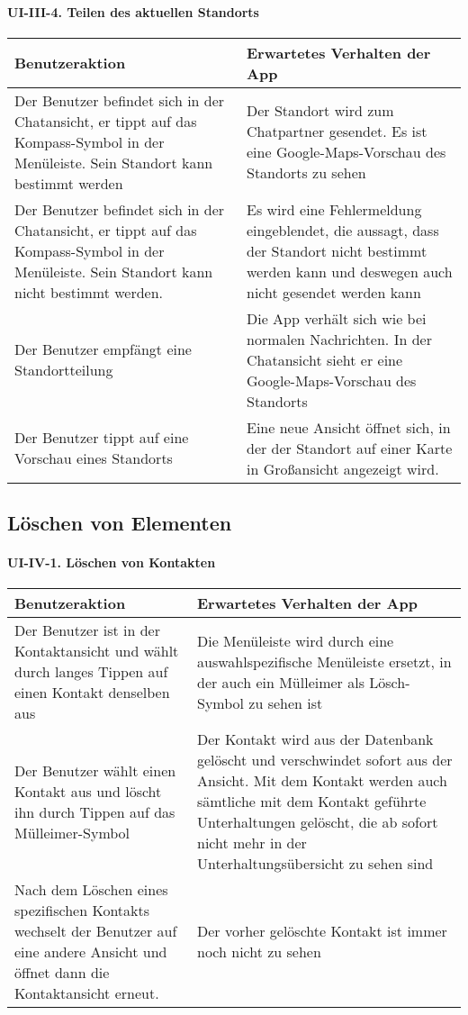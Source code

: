 \paragraph{UI-III-4. Teilen des aktuellen Standorts}\label{teilen-des-aktuellen-standorts}

\begin{longtable}{|p{8cm}|p{8.5cm}|}
\hline
Benutzeraktion & Erwartetes Verhalten der App\tabularnewline
\hline

Der Benutzer befindet sich in der Chatansicht, er tippt auf das
Kompass-Symbol in der Menüleiste. Sein Standort kann bestimmt werden &
Der Standort wird zum Chatpartner gesendet. Es ist eine
Google-Maps-Vorschau des Standorts zu sehen\tabularnewline
Der Benutzer befindet sich in der Chatansicht, er tippt auf das
Kompass-Symbol in der Menüleiste. Sein Standort kann nicht bestimmt
werden. & Es wird eine Fehlermeldung eingeblendet, die aussagt, dass der
Standort nicht bestimmt werden kann und deswegen auch nicht gesendet
werden kann\tabularnewline
Der Benutzer empfängt eine Standortteilung & Die App verhält sich wie
bei normalen Nachrichten. In der Chatansicht sieht er eine
Google-Maps-Vorschau des Standorts\tabularnewline
Der Benutzer tippt auf eine Vorschau eines Standorts & Eine neue Ansicht
öffnet sich, in der der Standort auf einer Karte in Großansicht
angezeigt wird.\tabularnewline
\hline
\end{longtable}

\clearpage
\subsection{ Löschen von Elementen}\label{iv-luxf6schen-von-elementen}

\paragraph{UI-IV-1. Löschen von Kontakten}\label{luxf6schen-von-kontakten}

\begin{longtable}{|p{8cm}|p{8.5cm}|}
\hline
Benutzeraktion & Erwartetes Verhalten der App\tabularnewline
\hline

Der Benutzer ist in der Kontaktansicht und wählt durch langes Tippen auf
einen Kontakt denselben aus & Die Menüleiste wird durch eine
auswahlspezifische Menüleiste ersetzt, in der auch ein Mülleimer als
Lösch-Symbol zu sehen ist\tabularnewline
Der Benutzer wählt einen Kontakt aus und löscht ihn durch Tippen auf das
Mülleimer-Symbol & Der Kontakt wird aus der Datenbank gelöscht und
verschwindet sofort aus der Ansicht. Mit dem Kontakt werden auch
sämtliche mit dem Kontakt geführte Unterhaltungen gelöscht, die ab
sofort nicht mehr in der Unterhaltungsübersicht zu sehen
sind\tabularnewline
Nach dem Löschen eines spezifischen Kontakts wechselt der Benutzer auf
eine andere Ansicht und öffnet dann die Kontaktansicht erneut. & Der
vorher gelöschte Kontakt ist immer noch nicht zu sehen\tabularnewline
\hline
\end{longtable}

